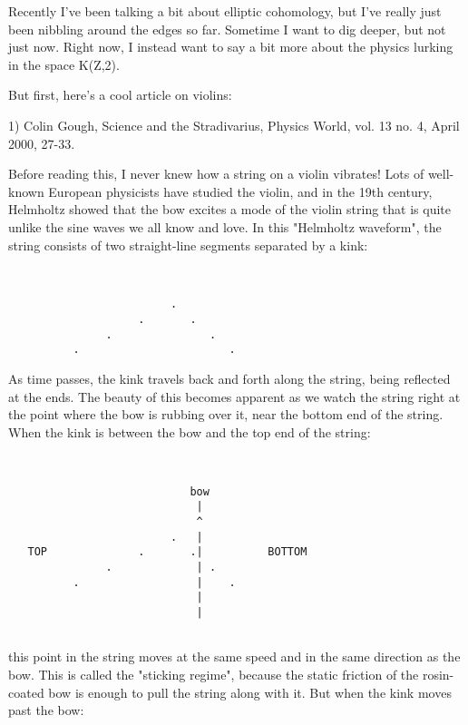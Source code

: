 

Recently I've been talking a bit about elliptic cohomology, but
I've really just been nibbling around the edges so far.  Sometime
I want to dig deeper, but not just now.  Right now, I instead want
to say a bit more about the physics lurking in the space K(Z,2).

But first, here's a cool article on violins:

1) Colin Gough, Science and the Stradivarius, Physics World, vol. 13
no. 4, April 2000, 27-33.

Before reading this, I never knew how a string on a violin vibrates!
Lots of well-known European physicists have studied the violin, and in
the 19th century, Helmholtz showed that the bow excites a mode of the
violin string that is quite unlike the sine waves we all know and love.
In this "Helmholtz waveform", the string consists of two straight-line
segments separated by a kink:



\begin{verbatim}


                         .   
                    .       .
               .               .
          .                       .

\end{verbatim}
    
As time passes, the kink travels back and forth along the string, being
reflected at the ends.  The beauty of this becomes apparent as we watch
the string right at the point where the bow is rubbing over it, near the
bottom end of the string.  When the kink is between the bow and the top
end of the string:



\begin{verbatim}


                            bow
                             |
                             ^
                         .   |
   TOP              .       .|          BOTTOM
               .             | .
          .                  |    .
                             |
                             |


\end{verbatim}
    
this point in the string moves at the same speed and in the same direction 
as the bow.  This is called the "sticking regime", because the static 
friction of the rosin-coated bow is enough to pull the string along with it.  
But when the kink moves past the bow:


